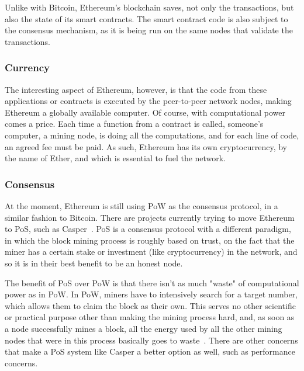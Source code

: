 Unlike with Bitcoin, Ethereum's blockchain saves, not only the transactions, but also the state of its smart contracts. The smart contract code is also subject to the consensus mechanism, as it is being run on the same nodes that validate the transactions.


\subsubsection{Currency}

The interesting aspect of Ethereum, however, is that the code from these applications or contracts is executed by the peer-to-peer network nodes, making Ethereum a globally available computer. Of course, with computational power comes a price. Each time a function from a contract is called, someone's computer, a mining node, is doing all the computations, and for each line of code, an agreed fee must be paid. As such, Ethereum has its own cryptocurrency, by the name of Ether, and which is essential to fuel the network.

\subsubsection{Consensus}

At the moment, Ethereum is still using PoW as the consensus protocol, in a similar fashion to Bitcoin. There are projects currently trying to move Ethereum to PoS, such as Casper~\cite{Buterin2017}. PoS is a consensus protocol with a different paradigm, in which the block mining process is roughly based on trust, on the fact that the miner has a certain stake or investment (like cryptocurrency) in the network, and so it is in their best benefit to be an honest node. 

The benefit of PoS over PoW is that there isn't as much "waste" of computational power as in PoW. In PoW, miners have to intensively search for a target number, which allows them to claim the block as their own. This serves no other scientific or practical purpose other than making the mining process hard, and, as soon as a node successfully mines a block, all the energy used  by all the other mining nodes that were in this process basically goes to waste~\cite{Buterin2013}. There are other concerns that make a PoS system like Casper a better option as well, such as performance concerns. 

